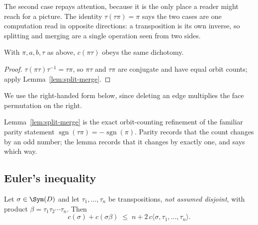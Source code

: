 The second case repays attention, because it is the only place a reader
might reach for a picture. The identity $\tau(\tau\pi) = \pi$ says the two
cases are one computation read in opposite directions: a transposition is
its own inverse, so splitting and merging are a single operation seen from
two sides.

\begin{corollary}\label{cor:split-merge-right}
With $\pi, a, b, \tau$ as above, $c(\pi\tau)$ obeys the same dichotomy.
\end{corollary}

\begin{proof}
$\tau(\pi\tau)\tau^{-1} = \tau\pi$, so $\pi\tau$ and $\tau\pi$ are
conjugate and have equal orbit counts; apply
Lemma~\ref{lem:split-merge}.
\end{proof}

We use the right-handed form below, since deleting an edge multiplies the
face permutation on the right.

\begin{remark}
Lemma~\ref{lem:split-merge} is the exact orbit-counting refinement of the
familiar parity statement $\operatorname{sgn}(\tau\pi) =
-\operatorname{sgn}(\pi)$. Parity records that the count changes by an odd
number; the lemma records that it changes by exactly one, and says which
way.
\end{remark}

\subsection{Euler's inequality}

\begin{theorem}\label{thm:euler-bound}
Let $\sigma \in \Sym(D)$ and let $\tau_1,\dots,\tau_n$ be transpositions,
\emph{not assumed disjoint}, with product $\beta = \tau_1\tau_2\cdots\tau_n$.
Then
\[
  c(\sigma) + c(\sigma\beta) \;\le\; n + 2\,c\langle \sigma, \tau_1, \dots, \tau_n\rangle .
\]
\end{theorem}

